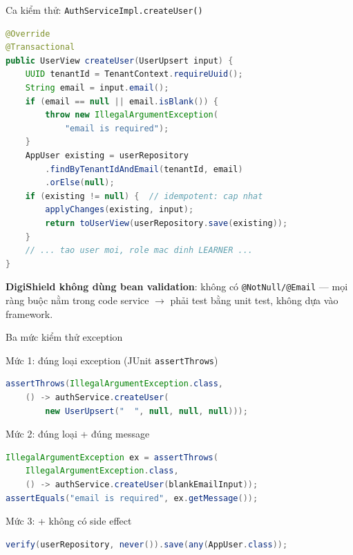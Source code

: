 \documentclass[aspectratio=169,12pt]{beamer}
\begin{document}
\begin{frame}[fragile]{Ca kiểm thử: \texttt{AuthServiceImpl.createUser()}}
  \vspace*{-0.25em}
\begin{lstlisting}[language=java,basicstyle=\ttfamily\scriptsize]
@Override
@Transactional
public UserView createUser(UserUpsert input) {
    UUID tenantId = TenantContext.requireUuid();
    String email = input.email();
    if (email == null || email.isBlank()) {
        throw new IllegalArgumentException(
            "email is required");
    }
    AppUser existing = userRepository
        .findByTenantIdAndEmail(tenantId, email)
        .orElse(null);
    if (existing != null) {  // idempotent: cap nhat
        applyChanges(existing, input);
        return toUserView(userRepository.save(existing));
    }
    // ... tao user moi, role mac dinh LEARNER ...
}
\end{lstlisting}

  \vspace{-0.5em}
  {\small \textbf{DigiShield không dùng bean validation}: không có
  \texttt{@NotNull/@Email} --- mọi ràng buộc nằm trong code service
  $\to$ phải test bằng unit test, không dựa vào framework.}
\end{frame}

\begin{frame}[fragile]{Ba mức kiểm thử exception}
  \begin{block}{Mức 1: đúng loại exception (JUnit \texttt{assertThrows})}
\begin{lstlisting}[language=java,basicstyle=\ttfamily\footnotesize]
assertThrows(IllegalArgumentException.class,
    () -> authService.createUser(
        new UserUpsert("  ", null, null, null)));
\end{lstlisting}
  \end{block}

  \begin{block}{Mức 2: đúng loại + đúng message}
\begin{lstlisting}[language=java,basicstyle=\ttfamily\footnotesize]
IllegalArgumentException ex = assertThrows(
    IllegalArgumentException.class,
    () -> authService.createUser(blankEmailInput));
assertEquals("email is required", ex.getMessage());
\end{lstlisting}
  \end{block}

  \begin{block}{Mức 3: + không có side effect}
\begin{lstlisting}[language=java,basicstyle=\ttfamily\footnotesize]
verify(userRepository, never()).save(any(AppUser.class));
\end{lstlisting}
  \end{block}
\end{frame}
\end{document}
